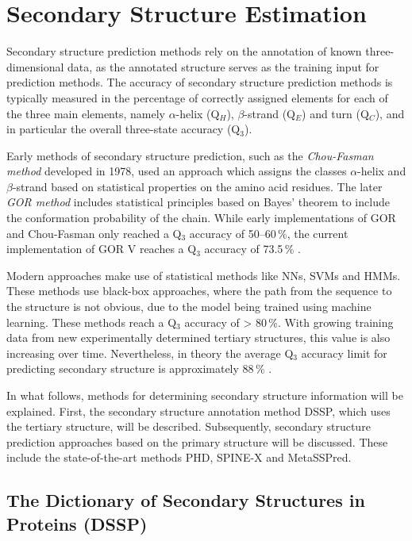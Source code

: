 

\section{Secondary Structure Estimation}
\label{ssec:SSPred}

Secondary structure prediction methods rely on the annotation of known three-dimensional data, as the annotated structure serves as the training input for prediction methods. The accuracy of secondary structure prediction methods is typically measured in the percentage of correctly assigned elements for each of the three main elements, namely  $\alpha$-helix (Q$_H$), $\beta$-strand (Q$_E$) and turn (Q$_C$), and in particular the overall three-state accuracy (Q$_3$).

Early methods of secondary structure prediction, such as the \textit{Chou-Fasman method} developed in 1978, used an approach which assigns the classes $\alpha$-helix and $\beta$-strand based on statistical properties on the amino acid residues. The later \textit{GOR method} includes statistical principles based on Bayes' theorem to include the conformation probability of the chain.
While early implementations of GOR and Chou-Fasman  only reached a Q$_3$ accuracy of 50--60\,\%, the current implementation of GOR V reaches a Q$_3$ accuracy of 73.5\,\% \citep{Sen.2005}. 

Modern approaches make use of statistical methods like \acp{NN}, \acp{SVM} and \acp{HMM}. 
These methods use black-box approaches, where the path from the sequence to the structure is not obvious, due to the model being trained using machine learning.  These methods reach a Q$_3$ accuracy of > 80\,\%. With growing training data from new experimentally determined tertiary structures, this value is also increasing over time. Nevertheless, in theory the average  Q$_3$ accuracy limit for predicting secondary structure is approximately    88\,\% \cite{Rost.2003}.

In what follows, methods for determining secondary structure information will be explained. First, the secondary structure annotation method  \ac{DSSP}, which uses the tertiary structure, will be described.
Subsequently, secondary structure prediction approaches based on the primary structure will be discussed. These include the state-of-the-art methods \ac{PHD}, SPINE-X and MetaSSPred.




\subsection{The Dictionary of Secondary Structures in Proteins (DSSP)}
\label{sec:DSSP}

